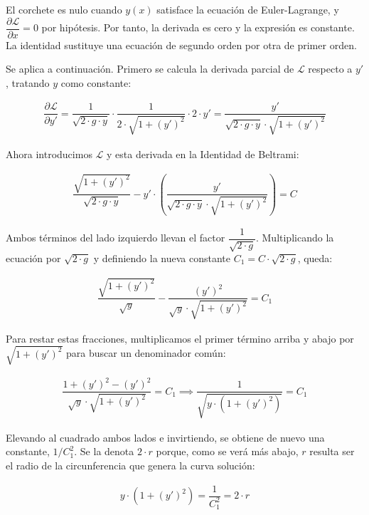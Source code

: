 \documentclass[
  spanish,
]{article}
\begin{document}
El corchete es nulo cuando \(y(x)\) satisface la ecuación de
Euler-Lagrange, y \(\dfrac{\partial \mathcal{L}}{\partial x} = 0\) por
hipótesis. Por tanto, la derivada es cero y la expresión es constante.
La identidad sustituye una ecuación de segundo orden por otra de primer
orden.

Se aplica a continuación. Primero se calcula la derivada parcial de
\(\mathcal{L}\) respecto a \(y'\), tratando \(y\) como constante:

\[
\begin{aligned}
\dfrac{\partial \mathcal{L}}{\partial y'} = \dfrac{1}{\sqrt{2 \cdot g \cdot y}} \cdot \dfrac{1}{2 \cdot \sqrt{1 + (y')^2}} \cdot 2 \cdot y' = \dfrac{y'}{\sqrt{2 \cdot g \cdot y} \cdot \sqrt{1 + (y')^2}}
\end{aligned}
\]

Ahora introducimos \(\mathcal{L}\) y esta derivada en la Identidad de
Beltrami:

\[
\begin{aligned}
\dfrac{\sqrt{1 + (y')^2}}{\sqrt{2 \cdot g \cdot y}} - y' \cdot \left( \dfrac{y'}{\sqrt{2 \cdot g \cdot y} \cdot \sqrt{1 + (y')^2}} \right) = C
\end{aligned}
\]

Ambos términos del lado izquierdo llevan el factor
\(\dfrac{1}{\sqrt{2 \cdot g}}\). Multiplicando la ecuación por
\(\sqrt{2 \cdot g}\) y definiendo la nueva constante
\(C_1 = C \cdot \sqrt{2 \cdot g}\), queda:

\[
\begin{aligned}
\dfrac{\sqrt{1 + (y')^2}}{\sqrt{y}} - \dfrac{(y')^2}{\sqrt{y} \cdot \sqrt{1 + (y')^2}} = C_1
\end{aligned}
\]

Para restar estas fracciones, multiplicamos el primer término arriba y
abajo por \(\sqrt{1 + (y')^2}\) para buscar un denominador común:

\[
\begin{aligned}
\dfrac{1 + (y')^2 - (y')^2}{\sqrt{y} \cdot \sqrt{1 + (y')^2}} = C_1 \implies \dfrac{1}{\sqrt{y \cdot (1 + (y')^2)}} = C_1
\end{aligned}
\]

Elevando al cuadrado ambos lados e invirtiendo, se obtiene de nuevo una
constante, \(1/C_1^2\). Se la denota \(2 \cdot r\) porque, como se verá
más abajo, \(r\) resulta ser el radio de la circunferencia que genera la
curva solución:

\[
\begin{aligned}
y \cdot (1 + (y')^2) = \dfrac{1}{C_1^2} = 2 \cdot r
\end{aligned}
\]
\end{document}
